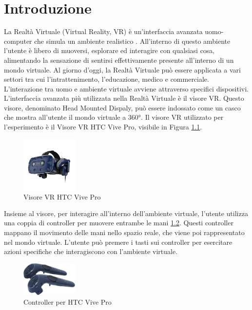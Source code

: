 \documentclass[target=bach,aauheader=]{thud}
\begin{document}
\chapter{Introduzione} %
\label{intro}
La Realtà Virtuale (Virtual Reality, VR) è un'interfaccia avanzata uomo-computer che simula un ambiente realistico \cite{Zheng}.
All'interno di questo ambiente l'utente è libero di muoversi, esplorare ed interagire con qualsiasi cosa, alimentando la sensazione di sentirsi effettivamente presente all'interno di un mondo virtuale.
Al giorno d'oggi, la Realtà Virtuale può essere applicata a vari settori tra cui l'intrattenimento, l'educazione, medico e commerciale. \\

L'interazione tra uomo e ambiente virtuale avviene attraverso specifici dispositivi.
L'interfaccia avanzata più utilizzata nella Realtà Virtuale è il visore VR. 
Questo visore, denominato Head Mounted Dispaly, può essere indossato come un casco che mostra all'utente il mondo virtuale a 360°.
Il visore VR utilizzato per l'esperimento è il Visore VR HTC Vive Pro, visibile in Figura \ref{fig:vive_pro}.

\begin{figure}[h]
    \centering
    \includegraphics[width=0.25\textwidth]{vive_pro}
    \caption{Visore VR HTC Vive Pro}
    \label{fig:vive_pro}
\end{figure}

Insieme al visore, per interagire all'interno dell'ambiente virtuale, l'utente utilizza una coppia di controller per muovere entrambe le mani \ref{fig:vive_contr}.
Questi controller mappano il movimento delle mani nello spazio reale, che viene poi rappresentato nel mondo virtuale. 
L'utente può premere i tasti sui controller per esercitare azioni specifiche che interagiscono con l'ambiente virtuale. \\

\begin{figure}[h]
    \centering
    \includegraphics[width=0.25\textwidth]{vive_contr}
    \caption{Controller per HTC Vive Pro}
    \label{fig:vive_contr}
\end{figure}
\end{document}
